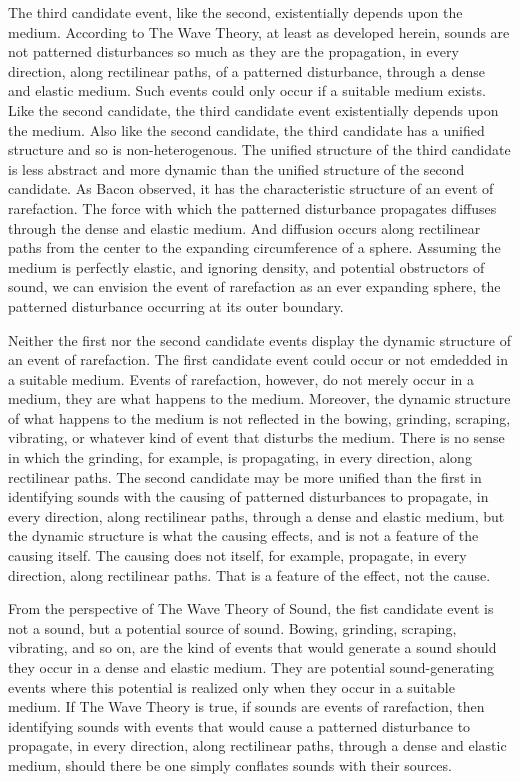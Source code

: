 \documentclass[12pt]{article}
\begin{document}
The third candidate event, like the second, existentially depends upon the me\-di\-um. According to The Wave Theory, at least as developed herein, sounds are not patterned disturbances so much as they are the propagation, in every direction, along rectilinear paths, of a patterned disturbance, through a dense and elastic medium. Such events could only occur if a suitable medium exists. Like the second candidate, the third candidate event existentially depends upon the medium. Also like the second candidate, the third candidate has a unified structure and so is non-heterogenous. The unified structure of the third candidate is less abstract and more dynamic than the unified structure of the second candidate. As Bacon observed, it has the characteristic structure of an event of rarefaction. The force with which the patterned disturbance propagates diffuses through the dense and elastic medium. And diffusion occurs along rectilinear paths from the center to the expanding circumference of a sphere. Assuming the medium is perfectly elastic, and ignoring density, and potential obstructors of sound, we can envision the event of rarefaction as an ever expanding sphere, the patterned disturbance occurring at its outer boundary. 

Neither the first nor the second candidate events display the dynamic structure of an event of rarefaction. The first candidate event could occur or not emdedded in a suitable medium. Events of rarefaction, however, do not merely occur in a medium, they are what happens to the medium. Moreover, the dynamic structure of what happens to the medium is not reflected in the bowing, grinding, scraping, vibrating, or whatever kind of event that disturbs the medium. There is no sense in which the grinding, for example, is propagating, in every direction, along rectilinear paths. The second candidate may be more unified than the first in identifying sounds with the causing of patterned disturbances to propagate, in every direction, along rectilinear paths, through a dense and elastic medium, but the dynamic structure is what the causing effects, and is not a feature of the causing itself. The causing does not itself, for example, propagate, in every direction, along rectilinear paths. That is a feature of the effect, not the cause.

From the perspective of The Wave Theory of Sound, the fist candidate event is not a sound, but a potential source of sound. Bowing, grinding, scraping, vibrating, and so on, are the kind of events that would generate a sound should they occur in a dense and elastic medium. They are potential sound-generating events where this potential is realized only when they occur in a suitable medium. If The Wave Theory is true, if sounds are events of rarefaction, then identifying sounds with events that would cause a patterned disturbance to propagate, in every direction, along rectilinear paths, through a dense and elastic medium, should there be one simply conflates sounds with their sources.
\end{document}

